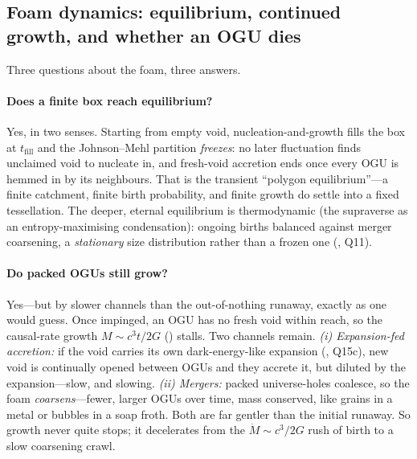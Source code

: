\subsection{Foam dynamics: equilibrium, continued growth, and whether an OGU dies}
\label{sec:foam-dynamics}

Three questions about the foam, three answers.

\paragraph{Does a finite box reach equilibrium?} Yes, in two senses. Starting from
empty void, nucleation-and-growth fills the box at $t_{\mathrm{fill}}$ and the
Johnson--Mehl partition \emph{freezes}: no later fluctuation finds unclaimed void
to nucleate in, and fresh-void accretion ends once every OGU is hemmed in by its
neighbours. That is the transient ``polygon equilibrium''---a finite catchment,
finite birth probability, and finite growth do settle into a fixed tessellation.
The deeper, eternal equilibrium is thermodynamic (the supraverse as an
entropy-maximising condensation): ongoing births balanced against merger
coarsening, a \emph{stationary} size distribution rather than a frozen one
(, Q11).

\paragraph{Do packed OGUs still grow?} Yes---but by slower channels than the
out-of-nothing runaway, exactly as one would guess. Once impinged, an OGU has no
fresh void within reach, so the causal-rate growth $M\sim c^3t/2G$
() stalls. Two channels remain. \emph{(i) Expansion-fed
accretion:} if the void carries its own dark-energy-like expansion
(, Q15c), new void is continually opened between OGUs and they
accrete it, but diluted by the expansion---slow, and slowing. \emph{(ii) Mergers:}
packed universe-holes coalesce, so the foam \emph{coarsens}---fewer, larger OGUs
over time, mass conserved, like grains in a metal or bubbles in a soap froth. Both
are far gentler than the initial runaway. So growth never quite stops; it
decelerates from the $\dot M\sim c^3/2G$ rush of birth to a slow coarsening crawl.

